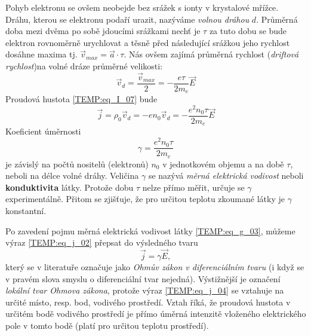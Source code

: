       Pohyb elektronu se ovšem neobejde bez srážek s ionty v krystalové mřížce. Dráhu, kterou se
      elektronu podaří urazit, nazýváme \emph{volnou dráhou} $d$. Průměrná doba mezi dvěma po sobě
      jdoucími srážkami nechť je $\tau$ za tuto dobu se bude elektron rovnoměrně urychlovat a těsně
      před následující srážkou jeho rychlost dosáhne maxima tj. $\vec{v}_{max} = \vec{a}\cdot\tau$.
      Nás ovšem zajímá průměrná rychlost (\emph{driftová rychlost})na volné dráze průměrné
      velikosti:
      \begin{equation}\label{TEMP:eq_vd_01}
        \vec{v}_d = \frac{\vec{v}_{max}}{2} = -\frac{e\tau}{2m_e}\vec{E}
      \end{equation}   
      Proudová hustota \ref{TEMP:eq_I_07} bude
      \begin{equation}\label{TEMP:eq_j_02}
        \vec{j} = \rho_0\vec{v}_d= -en_0\vec{v}_d = -\frac{e^2n_0\tau}{2m_e}\vec{E}
      \end{equation}       
      Koeficient úměrnosti 
      \begin{equation}\label{TEMP:eq_g_03}
        \gamma = \frac{e^2n_0\tau}{2m_e}
      \end{equation}     
      je závislý na počtů nositelů (elektronů) $n_0$ v jednotkovém objemu a na době $\tau$, neboli
      na délce volné dráhy. Veličina $\gamma$ se nazývá \emph{měrná elektrická vodivost} neboli
      \textbf{konduktivita} látky. Protože dobu $\tau$ nelze přímo měřit, určuje se $\gamma$
      experimentálně. Přitom se zjišťuje, že pro určitou teplotu zkoumané látky je $\gamma$
      konstantní.
      
      Po zavedení pojmu měrná elektrická vodivost látky \ref{TEMP:eq_g_03}, můžeme výraz
      \ref{TEMP:eq_j_02} přepsat do výsledného tvaru
      \begin{equation}\label{TEMP:eq_j_04}
        \vec{j} = \gamma\vec{E},
      \end{equation}              
      který se v literatuře označuje jako \emph{Ohmův zákon v diferenciálním tvaru} (i když se v
      pravém slova smyslu o diferenciální tvar nejedná). Výstižnější je označení \emph{lokální tvar
      Ohmova zákona}, protože výraz \ref{TEMP:eq_j_04} se vztahuje na určité místo, resp. bod,
      vodivého prostředí. Vztah říká, že proudová hustota v určitém bodě vodivého prostředí je
      přímo úměrná intenzitě vloženého elektrického pole v tomto bodě (platí pro určitou teplotu
      prostředí).
      
